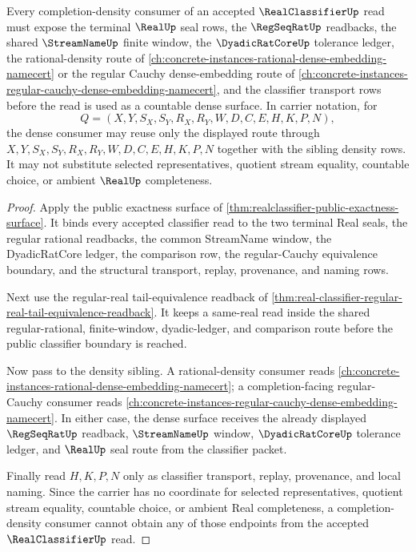 \begin{theorem}
\label{thm:realclassifier-completion-density-consumer}
Every completion-density consumer of an accepted $\RealClassifierUp$ read must expose the terminal $\RealUp$ seal rows, the $\RegSeqRatUp$ readbacks, the shared $\StreamNameUp$ finite window, the $\DyadicRatCoreUp$ tolerance ledger, the rational-density route of \autoref{ch:concrete-instances-rational-dense-embedding-namecert} or the regular Cauchy dense-embedding route of \autoref{ch:concrete-instances-regular-cauchy-dense-embedding-namecert}, and the classifier transport rows before the read is used as a countable dense surface. In carrier notation, for
$$
Q=(X,Y,S_X,S_Y,R_X,R_Y,W,D,C,E,H,K,P,N),
$$
the dense consumer may reuse only the displayed route through $X,Y,S_X,S_Y,R_X,R_Y,W,D,C,E,H,K,P,N$ together with the sibling density rows. It may not substitute selected representatives, quotient stream equality, countable choice, or ambient $\RealUp$ completeness.
\end{theorem}
\begin{proof}
Apply the public exactness surface of \autoref{thm:realclassifier-public-exactness-surface}. It binds every accepted classifier read to the two terminal Real seals, the regular rational readbacks, the common StreamName window, the DyadicRatCore ledger, the comparison row, the regular-Cauchy equivalence boundary, and the structural transport, replay, provenance, and naming rows.

Next use the regular-real tail-equivalence readback of \autoref{thm:real-classifier-regular-real-tail-equivalence-readback}. It keeps a same-real read inside the shared regular-rational, finite-window, dyadic-ledger, and comparison route before the public classifier boundary is reached.

Now pass to the density sibling. A rational-density consumer reads \autoref{ch:concrete-instances-rational-dense-embedding-namecert}; a completion-facing regular-Cauchy consumer reads \autoref{ch:concrete-instances-regular-cauchy-dense-embedding-namecert}. In either case, the dense surface receives the already displayed $\RegSeqRatUp$ readback, $\StreamNameUp$ window, $\DyadicRatCoreUp$ tolerance ledger, and $\RealUp$ seal route from the classifier packet.

Finally read $H,K,P,N$ only as classifier transport, replay, provenance, and local naming. Since the carrier has no coordinate for selected representatives, quotient stream equality, countable choice, or ambient Real completeness, a completion-density consumer cannot obtain any of those endpoints from the accepted $\RealClassifierUp$ read.
\end{proof}

